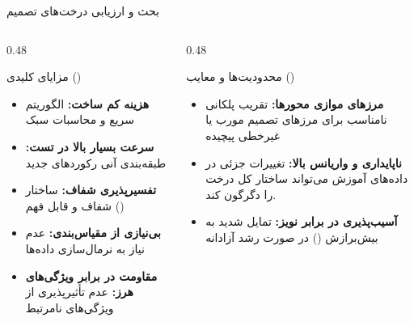 
\begin{frame}{بحث و ارزیابی درخت‌های تصمیم}{}
  \begin{columns}[T]
    \begin{column}{0.48\textwidth}
      \begin{block}{مزایای کلیدی ()}
        \begin{itemize}
          \setlength{\itemsep}{3pt}
          \item \textbf{هزینه کم ساخت:} الگوریتم سریع و محاسبات سبک
          \item \textbf{سرعت بسیار بالا در تست:} طبقه‌بندی آنی رکوردهای جدید
          \item \textbf{تفسیرپذیری شفاف:} ساختار شفاف و قابل فهم ()
          \item \textbf{بی‌نیازی از مقیاس‌بندی:} عدم نیاز به نرمال‌سازی داده‌ها
          \item \textbf{مقاومت در برابر ویژگی‌های هرز:} عدم تأثیرپذیری از ویژگی‌های نامرتبط
        \end{itemize}
      \end{block}
    \end{column}
    \begin{column}{0.48\textwidth}
      \begin{alertblock}{محدودیت‌ها و معایب ()}
        \begin{itemize}
          \setlength{\itemsep}{3pt}
          \item \textbf{مرزهای موازی محورها:} تقریب پلکانی نامناسب برای مرزهای تصمیم مورب یا غیرخطی پیچیده
          \item \textbf{ناپایداری و واریانس بالا:} تغییرات جزئی در داده‌های آموزش می‌تواند ساختار کل درخت را دگرگون کند.
          \item \textbf{آسیب‌پذیری در برابر نویز:} تمایل شدید به بیش‌برازش () در صورت رشد آزادانه
        \end{itemize}
      \end{alertblock}
    \end{column}
  \end{columns}
\end{frame}

